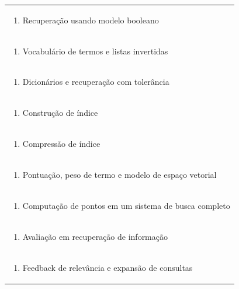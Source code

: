 \documentclass[11pt]{article}
\begin{document}
\begin{center}
\begin{longtable}{|p{4cm}|p{4cm}|p{4cm}|p{4cm}|}
\multicolumn{4}{|p{\dimexpr 16cm + 6\tabcolsep\relax}|}{\begin{enumerate}[start=2]\item Recuperação usando modelo booleano\end{enumerate}}\\
\multicolumn{4}{|p{\dimexpr 16cm + 6\tabcolsep\relax}|}{\begin{enumerate}[start=3]\item Vocabulário de termos e listas invertidas\end{enumerate}}\\
\multicolumn{4}{|p{\dimexpr 16cm + 6\tabcolsep\relax}|}{\begin{enumerate}[start=4]\item Dicionários e recuperação com tolerância\end{enumerate}}\\
\multicolumn{4}{|p{\dimexpr 16cm + 6\tabcolsep\relax}|}{\begin{enumerate}[start=5]\item Construção de índice\end{enumerate}}\\
\multicolumn{4}{|p{\dimexpr 16cm + 6\tabcolsep\relax}|}{\begin{enumerate}[start=6]\item Compressão de índice\end{enumerate}}\\
\multicolumn{4}{|p{\dimexpr 16cm + 6\tabcolsep\relax}|}{\begin{enumerate}[start=7]\item Pontuação, peso de termo e modelo de espaço vetorial\end{enumerate}}\\
\multicolumn{4}{|p{\dimexpr 16cm + 6\tabcolsep\relax}|}{\begin{enumerate}[start=8]\item Computação de pontos em um sistema de busca completo\end{enumerate}}\\
\multicolumn{4}{|p{\dimexpr 16cm + 6\tabcolsep\relax}|}{\begin{enumerate}[start=9]\item Avaliação em recuperação de informação\end{enumerate}}\\
\multicolumn{4}{|p{\dimexpr 16cm + 6\tabcolsep\relax}|}{\begin{enumerate}[start=10]\item Feedback de relevância e expansão de consultas\end{enumerate}}\\

\end{longtable}
\end{center}
\end{document}
